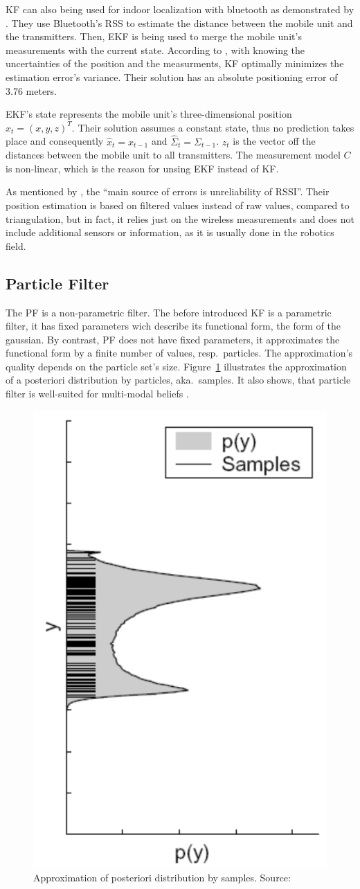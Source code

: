 \acs{KF} can also being used for indoor localization with bluetooth as demonstrated by \citet{kotanen:exp_local_pos_bt}. They use Bluetooth's \acs{RSS} to estimate the distance between the mobile unit and the transmitters. Then, \acl{EKF} is being used to merge the mobile unit's measurements with the current state. According to \cite{kotanen:exp_local_pos_bt}, with knowing the uncertainties of the position and the measurments, \acs{KF} optimally minimizes the estimation error's variance. Their solution has an absolute positioning error of 3.76 meters.

\acs{EKF}'s state represents the mobile unit's three-dimensional position $x_t = (x, y, z)^T$. Their solution assumes a constant state, thus no prediction takes place and consequently $\hat{x}_t = x_{t-1}$ and $\hat{\Sigma}_t = \Sigma_{t-1}$. $z_t$ is the vector off the distances between the mobile unit to all transmitters. The measurement model $C$ is non-linear, which is the reason for unsing \acs{EKF} instead of \acs{KF}.

As mentioned by \citet{kotanen:exp_local_pos_bt}, the ``main source of errors is unreliability of \acs{RSSI}''. Their position estimation is based on filtered values instead of raw values, compared to triangulation, but in fact, it relies just on the wireless measurements and does not include additional sensors or information, as it is usually done in the robotics field.

\subsection{Particle Filter}
The \ac{PF} is a non-parametric filter. The before introduced \acs{KF} is a parametric filter, it has fixed parameters wich describe its functional form, the form of the gaussian. By contrast, \acs{PF} does not have fixed parameters, it approximates the functional form by a finite number of values, resp.\ particles. The approximation's quality depends on the particle set's size. Figure~\ref{fig:pf_approx} illustrates the approximation of a posteriori distribution by particles, aka.\ samples. It also shows, that particle filter is well-suited for multi-modal beliefs \citep{thrun:prob_robo}.

\begin{figure}
	\includegraphics[height=0.45\textwidth]{figures/pf_approx}
	\caption{Approximation of posteriori distribution by samples. Source: \citep{thrun:prob_robo}}
	\label{fig:pf_approx}
\end{figure} 

